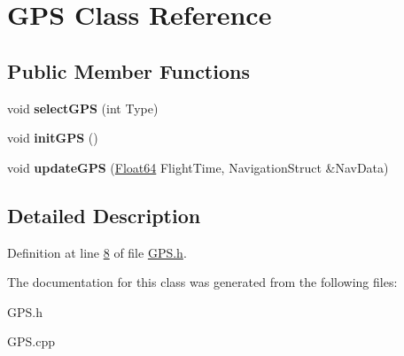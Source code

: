 \hypertarget{class_g_p_s}{}\section{G\+PS Class Reference}
\label{class_g_p_s}
\subsection*{Public Member Functions}
\begin{DoxyCompactItemize}
\item 
\mbox{\label{class_g_p_s_a0c87197e52afcfd706407ef06e099f00}} 
void {\bfseries select\+G\+PS} (int Type)
\item 
\mbox{\label{class_g_p_s_a0775b2666962335df5945d3d9b1a3188}} 
void {\bfseries init\+G\+PS} ()
\item 
\mbox{\label{class_g_p_s_a8a96da9263ae58dd706c9c98f26187fc}} 
void {\bfseries update\+G\+PS} (\hyperlink{group___tools_ga3f1431cb9f76da10f59246d1d743dc2c}{Float64} Flight\+Time, Navigation\+Struct \&Nav\+Data)
\end{DoxyCompactItemize}


\subsection{Detailed Description}


Definition at line \hyperlink{_g_p_s_8h_source_l00008}{8} of file \hyperlink{_g_p_s_8h_source}{G\+P\+S.\+h}.



The documentation for this class was generated from the following files\+:\begin{DoxyCompactItemize}
\item 
G\+P\+S.\+h\item 
G\+P\+S.\+cpp\end{DoxyCompactItemize}
